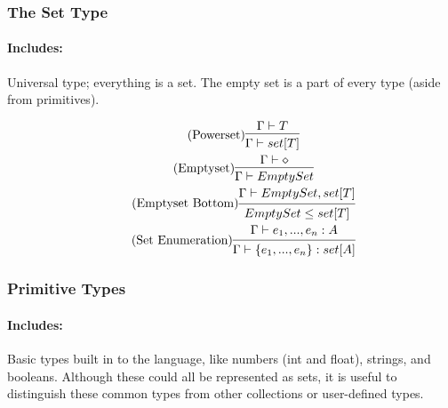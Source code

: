 \documentclass{article}
\begin{document}
\subsubsection{The Set Type}
\paragraph{Includes:} Universal type; everything is a set. The empty set is a part of every type (aside from primitives).

\begin{gather}
\tag{Powerset}
\begin{prooftree}
\hypo{\Gamma \vdash T}
\infer1{\Gamma \vdash set[T]}
\end{prooftree}
\\
\tag{Emptyset}
\begin{prooftree}
\hypo{\Gamma \vdash \diamond}
\infer1{\Gamma \vdash EmptySet}
\end{prooftree}
\\
\tag{Emptyset Bottom}
\begin{prooftree}
\hypo{\Gamma \vdash EmptySet, set[T]}
\infer1{EmptySet \leq set[T]}
\end{prooftree}
\\
\tag{Set Enumeration}
\begin{prooftree}
\hypo{\Gamma \vdash e_1, ..., e_n: A}
\infer1{\Gamma \vdash \{e_1, ..., e_n\}: set[A]}
\end{prooftree}
\end{gather}

\subsubsection{Primitive Types}
\paragraph{Includes:} Basic types built in to the language, like numbers (int and float), strings, and booleans. Although these could all be represented as sets, it is useful to distinguish these common types from other collections or user-defined types.
\end{document}

